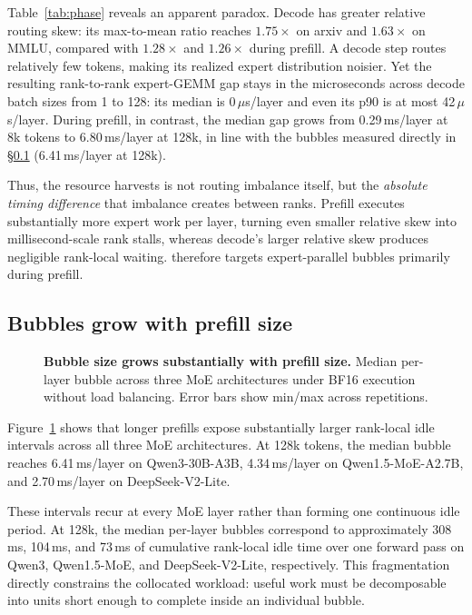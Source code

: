 Table~\ref{tab:phase} reveals an apparent paradox. Decode has greater
relative routing skew: its max-to-mean ratio reaches
$1.75\times$ on arxiv and $1.63\times$ on MMLU, compared with
$1.28\times$ and $1.26\times$ during prefill. A decode step routes
relatively few tokens, making its realized expert distribution noisier.
Yet the resulting rank-to-rank expert-\ac{GEMM} gap stays in the
microseconds across decode batch sizes from 1 to 128: its median is
0\,$\mu$s/layer and even its p90 is at most 42\,$\mu$s/layer. During
prefill, in contrast, the median gap grows from 0.29\,ms/layer at 8k
tokens to 6.80\,ms/layer at 128k, in line with the bubbles measured
directly in \S\ref{sec:char-context}  (6.41\,ms/layer at 128k).

Thus, the resource \sys{} harvests is not routing imbalance itself, but
the \emph{absolute timing difference} that imbalance creates between
ranks. Prefill executes substantially more expert work per layer, turning
even smaller relative skew into millisecond-scale rank stalls, whereas
decode's larger relative skew produces negligible rank-local waiting.
\sys{} therefore targets expert-parallel bubbles primarily during
prefill.

\subsection{Bubbles grow with prefill size}
\label{sec:char-context}

\begin{figure}[t]
  \centering
  \caption{
    \textbf{Bubble size grows substantially with prefill size.}
    Median per-layer bubble across three \ac{MoE} architectures under BF16
    execution without load balancing. Error bars show min/max across
    repetitions.
  }
  \label{fig:context}
\end{figure}

Figure~\ref{fig:context} shows that longer prefills expose substantially
larger rank-local idle intervals across all three \ac{MoE} architectures.
At 128k tokens, the median bubble reaches 6.41\,ms/layer on
Qwen3-30B-A3B, 4.34\,ms/layer on Qwen1.5-MoE-A2.7B, and
2.70\,ms/layer on DeepSeek-V2-Lite.

These intervals recur at every \ac{MoE} layer rather than forming one
continuous idle period. At 128k, the median per-layer bubbles correspond
to approximately 308\,ms, 104\,ms, and 73\,ms of cumulative rank-local
idle time over one forward pass on Qwen3, Qwen1.5-MoE, and
DeepSeek-V2-Lite, respectively. This fragmentation directly constrains
the collocated workload: useful work must be decomposable into units
short enough to complete inside an individual bubble.

